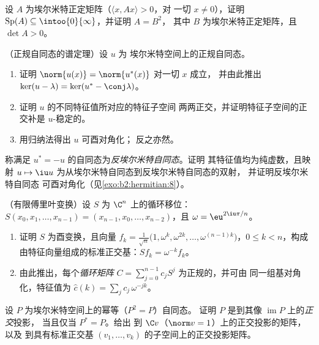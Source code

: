 \begin{exercise}[$\star\star$]\label{exo:b2:hermitian:7}
设 $A$ 为埃尔米特正定矩阵（$\langle x, Ax\rangle > 0$，对
一切 $x \neq 0$），证明 $\operatorname{Sp}(A) \subseteq
\intoo{0}{\infty}$，并证明 $A = B^2$，
其中 $B$ 为埃尔米特正定矩阵，且 $\det A > 0$。
\end{exercise}

\begin{exercise}[$\star\star\star$]\label{exo:b2:hermitian:8}
（正规自同态的谱定理）设 $u$ 为
埃尔米特空间上的正规自同态。
\begin{enumerate}
  \item 证明 $\norm{u(x)} = \norm{u^*(x)}$ 对一切 $x$ 成立，
        并由此推出 $\ker(u - \lambda) = \ker(u^* - \conj\lambda)$。
  \item 证明 $u$ 的不同特征值所对应的特征子空间
        两两正交，并证明特征子空间的正交补是
        $u$-稳定的。
  \item 用归纳法得出 $u$ 可酉对角化；
        反之亦然。
\end{enumerate}
\end{exercise}

\begin{exercise}[$\star$]\label{exo:b2:hermitian:9}
称满足 $u^* = -u$ 的自同态为\emph{反埃尔米特自同态}。证明
其特征值均为纯虚数，且映射 $u \mapsto \iu
u$ 为从埃尔米特自同态到反埃尔米特自同态的双射，
并证明反埃尔米特自同态
可酉对角化（见\cref{exo:b2:hermitian:8}）。
\end{exercise}

\begin{exercise}[$\star\star$]\label{exo:b2:hermitian:10}
（有限傅里叶变换）设 $S$ 为
$\C^n$ 上的循环移位：$S(x_0, x_1, \dots, x_{n-1}) = (x_{n-1}, x_0, \dots,
x_{n-2})$，且 $\omega = \eu^{2\iu\pi/n}$。
\begin{enumerate}
  \item 证明 $S$ 为酉变换，且向量 $f_k =
        \frac{1}{\sqrt n}\bigl(1, \omega^k, \omega^{2k}, \dots,
        \omega^{(n-1)k}\bigr)$，$0 \leq k < n$，构成
        由特征向量组成的标准正交基：$Sf_k = \omega^{-k}
        f_k$。
  \item 由此推出，每个\emph{循环矩阵} $C =
        \sum_{j=0}^{n-1} c_jS^j$ 为正规的，并可由
        同一组基对角化，特征值为 $\widehat c(k) = \sum_j
        c_j\,\omega^{-jk}$。
\end{enumerate}
\end{exercise}

\begin{exercise}[$\star\star$]\label{exo:b2:hermitian:11}
设 $P$ 为埃尔米特空间上的幂等（$P^2 = P$）自同态。
证明 $P$ 是到其像 $\operatorname{im} P$ 上的\emph{正交}投影，
当且仅当 $P^* = P$。给出
到 $\C v$（$\norm v = 1$）上的正交投影的矩阵，以及
到具有标准正交基 $(v_1, \dots, v_k)$ 的子空间上的正交投影矩阵。
\end{exercise}

